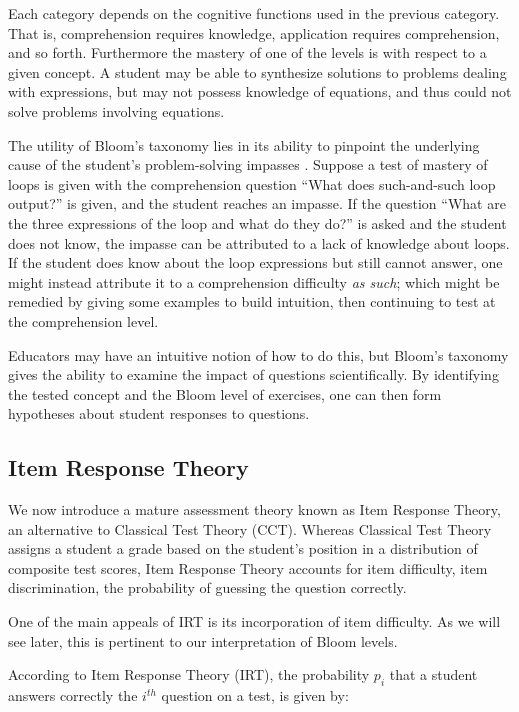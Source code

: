 \documentclass[a4paper,twocolumn]{article}
\begin{document}
Each category depends on the cognitive functions used in the previous category.
That is, comprehension requires knowledge, application requires comprehension,
and so forth.  Furthermore the mastery of one of the levels is with respect to
a given concept.  A student may be able to synthesize solutions to problems
dealing with expressions, but may not possess knowledge of equations, and thus
could not solve problems involving equations.

The utility of Bloom's taxonomy lies in its ability to pinpoint the underlying
cause of the student's problem-solving impasses \cite{shuhidan2011}.  Suppose a
test of mastery of loops is given with the comprehension question ``What does
such-and-such loop output?'' is given, and the student reaches an impasse.  If
the question ``What are the three expressions of the loop and what do they
do?'' is asked and the student does not know, the impasse can be attributed to
a lack of knowledge about loops.  If the student does know about the loop
expressions but still cannot answer, one might instead attribute it to a
comprehension difficulty \emph{as such}; which might be remedied by giving some
examples to build intuition, then continuing to test at the comprehension
level.

Educators may have an intuitive notion of how to do this, but Bloom's taxonomy
gives the ability to examine the impact of questions scientifically.  By
identifying the tested concept and the Bloom level of exercises, one can then
form hypotheses about student responses to questions.  


\subsection{Item Response Theory}

We now introduce a mature assessment theory known as Item Response Theory, an
alternative to Classical Test Theory (CCT).  Whereas Classical Test Theory
assigns a student a grade based on the student's position in a distribution of
composite test scores, Item Response Theory accounts for item difficulty,
item discrimination, the probability of guessing the question correctly.

One of the main appeals of IRT is its incorporation of item difficulty.
As we will see later, this is pertinent to our interpretation of Bloom
levels.  

According to Item Response Theory (IRT), the probability $p_i$ that a student
answers correctly the $i^{th}$ question on a test, is given by:
\end{document}
